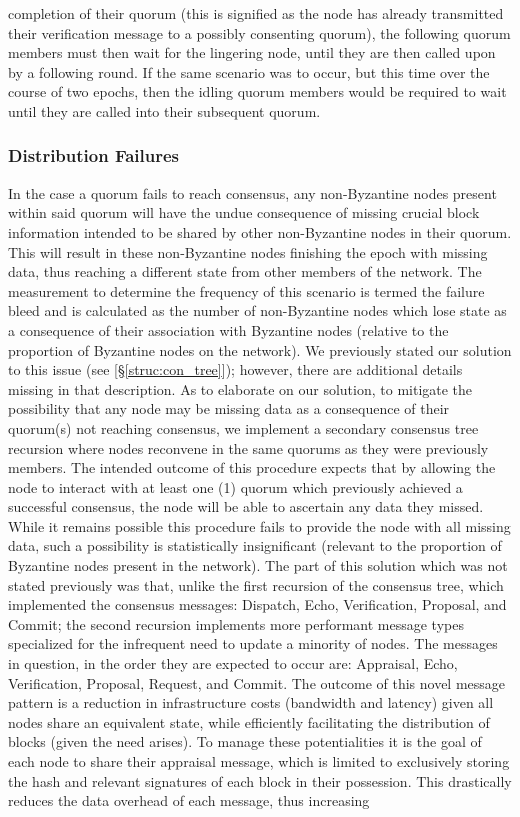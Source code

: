 completion of their quorum (this is signified as the node has already transmitted their verification message to a possibly consenting quorum), the following quorum members must then wait for the lingering node, until they are then called upon by a following round. If the same scenario was to occur, but this time over the course of two epochs, then the idling quorum members would be required to wait until they are called into their subsequent quorum.


\subsubsection{Distribution Failures}\label{struc:dist_fail} In the case a quorum fails to reach consensus, any non-Byzantine nodes present within said quorum will have the undue consequence of missing crucial block information intended to be shared by other non-Byzantine nodes in their quorum. This will result in these non-Byzantine nodes finishing the epoch with missing data, thus reaching a different state from other members of the network. The measurement to determine the frequency of this scenario is termed the failure bleed and is calculated as the number of non-Byzantine nodes which lose state as a consequence of their association with Byzantine nodes (relative to the proportion of Byzantine nodes on the network). We previously stated our solution to this issue (see \textit{} [\S\ref{struc:con_tree}]); however, there are additional details missing in that description. As to elaborate on our solution, to mitigate the possibility that any node may be missing data as a consequence of their quorum(s) not reaching consensus, we implement a secondary consensus tree recursion where nodes reconvene in the same quorums as they were previously members. The intended outcome of this procedure expects that by allowing the node to interact with at least one (1) quorum which previously achieved a successful consensus, the node will be able to ascertain any data they missed. While it remains possible this procedure fails to provide the node with all missing data, such a possibility is statistically insignificant (relevant to the proportion of Byzantine nodes present in the network). The part of this solution which was not stated previously was that, unlike the first recursion of the consensus tree, which implemented the consensus messages: Dispatch, Echo, Verification, Proposal, and Commit; the second recursion implements more performant message types specialized for the infrequent need to update a minority of nodes. The messages in question, in the order they are expected to occur are: Appraisal, Echo, Verification, Proposal, Request, and Commit. The outcome of this novel message pattern is a reduction in infrastructure costs (bandwidth and latency) given all nodes share an equivalent state, while efficiently facilitating the distribution of blocks (given the need arises). To manage these potentialities it is the goal of each node to share their appraisal message, which is limited to exclusively storing the hash and relevant signatures of each block in their possession. This drastically reduces the data overhead of each message, thus increasing 